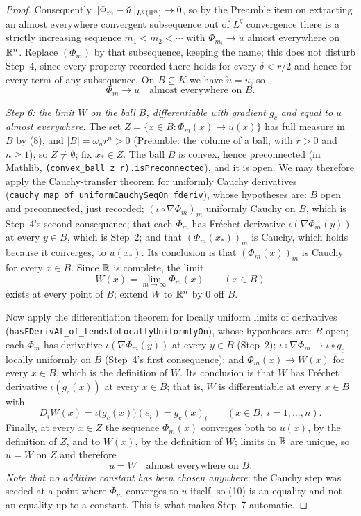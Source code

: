 \begin{proof}
Consequently $\|\Phi_m-\check u\|_{L^q(\mathbb{R}^n)}\to0$, so by the Preamble item on
extracting an almost everywhere convergent subsequence out of $L^q$ convergence
there is a strictly increasing sequence $m_1<m_2<\cdots$ with
$\Phi_{m_i}\to\check u$ almost everywhere on $\mathbb{R}^n$.  Replace $(\Phi_m)$ by that
subsequence, keeping the name; this does not disturb Step~4, since every
property recorded there holds for every $\delta<r/2$ and hence for every term of
any subsequence.  On $B\subseteq K$ we have $\check u=u$, so
\[
\Phi_m\to u\quad\text{almost everywhere on }B .
\tag{8}
\]

\medskip
\noindent\emph{Step 6: the limit $W$ on the ball $B$, differentiable with
gradient $g_c$ and equal to $u$ almost everywhere.}  The set
$Z=\{x\in B:\Phi_m(x)\to u(x)\}$ has full measure in $B$ by (8), and
$|B|=\omega_nr^n>0$ (Preamble: the volume of a ball, with $r>0$ and $n\ge1$), so
$Z\ne\emptyset$; fix $x_\ast\in Z$.  The ball $B$ is convex, hence preconnected
(in Mathlib, \texttt{(convex\_ball z r).isPreconnected}), and it is open.  We may
therefore apply the Cauchy-transfer theorem for uniformly Cauchy derivatives
(\texttt{cauchy\_map\_of\_uniformCauchySeqOn\_fderiv}), whose hypotheses are:
$B$ open and preconnected, just recorded; $(\iota\circ\nabla\Phi_m)_m$ uniformly
Cauchy on $B$, which is Step~4's second consequence; that each $\Phi_m$ has
Fr\'echet derivative $\iota(\nabla\Phi_m(y))$ at every $y\in B$, which is
Step~2; and that $(\Phi_m(x_\ast))_m$ is Cauchy, which holds because it
converges, to $u(x_\ast)$.  Its conclusion is that $(\Phi_m(x))_m$ is Cauchy for
every $x\in B$.  Since $\mathbb{R}$ is complete, the limit
\[
W(x)=\lim_{m\to\infty}\Phi_m(x)
\qquad(x\in B)
\]
exists at every point of $B$; extend $W$ to $\mathbb{R}^n$ by $0$ off $B$.

Now apply the differentiation theorem for locally uniform limits of derivatives
(\texttt{hasFDerivAt\_of\_tendstoLocallyUniformlyOn}), whose hypotheses are: $B$
open; each $\Phi_m$ has derivative $\iota(\nabla\Phi_m(y))$ at every $y\in B$
(Step~2); $\iota\circ\nabla\Phi_m\to\iota\circ g_c$ locally uniformly on $B$
(Step~4's first consequence); and $\Phi_m(x)\to W(x)$ for every $x\in B$, which
is the definition of $W$.  Its conclusion is that $W$ has Fr\'echet derivative
$\iota(g_c(x))$ at every $x\in B$; that is, $W$ is differentiable at every
$x\in B$ with
\[
D_iW(x)=\iota\bigl(g_c(x)\bigr)(e_i)=g_c(x)_i
\qquad(x\in B,\ i=1,\dots,n).
\tag{9}
\]
Finally, at every $x\in Z$ the sequence $\Phi_m(x)$ converges both to $u(x)$, by
the definition of $Z$, and to $W(x)$, by the definition of $W$; limits in $\mathbb{R}$
are unique, so $u=W$ on $Z$ and therefore
\[
u=W\quad\text{almost everywhere on }B .
\tag{10}
\]
\emph{Note that no additive constant has been chosen anywhere}: the Cauchy step
was seeded at a point where $\Phi_m$ converges to $u$ itself, so (10) is an
equality and not an equality up to a constant.  This is what makes Step~7
automatic.


\end{proof}
